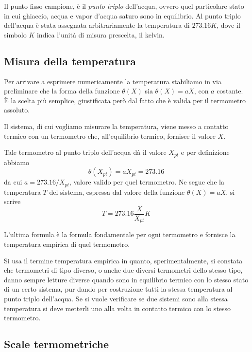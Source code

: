 \documentclass[class=book, crop=false, oneside, 12pt]{standalone}
\begin{document}
Il punto fisso campione, è il \emph{punto triplo} dell'acqua, ovvero quel particolare stato in cui ghiaccio, acqua e vapor d'acqua saturo sono in equilibrio. 
Al punto triplo dell'acqua è stata assegnata arbitrariamente la temperatura di \(273.16 K\), dove il simbolo \(K\) indica l'unità di misura prescelta, il kelvin.

\subsection{Misura della temperatura}

Per arrivare a esprimere numericamente la temperatura stabiliamo in via preliminare che la forma della funzione \(\theta(X)\) sia \(\theta(X) = aX\), con \(a\) costante.
È la scelta più semplice, giustificata però dal fatto che è valida per il termometro assoluto.

Il sistema, di cui vogliamo misurare la temperatura, viene messo a contatto termico con un termometro che, all'equilibrio termico, fornisce il valore \(X\).

Tale termometro al punto triplo dell'acqua dà il valore \(X_{pt}\) e per definizione abbiamo
\begin{equation*}
    \theta (X_{pt}) = a X_{pt} = 273.16
\end{equation*}
da cui \(a = 273.16/X_{pt}\), valore valido per quel termometro. Ne segue che la temperatura \(T\) del sistema, espressa dal valore della funzione \(\theta (X) = a X\), si scrive
\begin{equation}
    T = 273.16 \frac{X}{X_{pt}} K    
\end{equation}

L'ultima formula è la formula fondamentale per ogni termometro e fornisce la temperatura empirica di quel termometro.

Si usa il termine temperatura empirica in quanto, sperimentalmente, si constata che termometri di tipo diverso, o anche due diversi termometri dello stesso tipo, danno sempre letture diverse quando sono in equilibrio termico con lo stesso stato di un certo sistema, pur dando per costruzione tutti la stessa temperatura al punto triplo dell'acqua.
Se si vuole verificare se due sistemi sono alla stessa temperatura si deve metterli uno alla volta in contatto termico con lo stesso termometro. 

\subsection{Scale termometriche}
\end{document}

